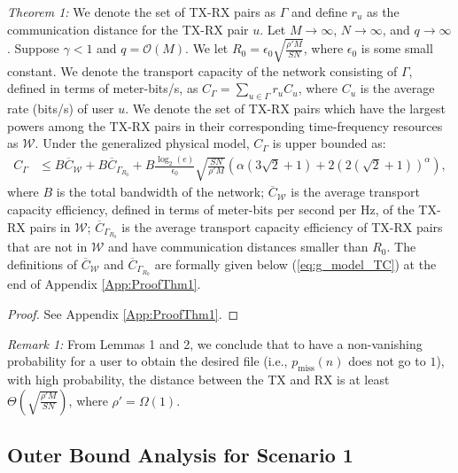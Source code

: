 \documentclass[journal,draftclsnofoot,onecolumn,12pt,twoside]{IEEEtran}
\begin{document}
{\em Theorem 1:} We denote the set of TX-RX pairs as $\Gamma$ and define $r_u$ as the communication distance for the TX-RX pair $u$. Let $M\to\infty$, $N\to\infty$, and $q\to\infty$. Suppose $\gamma<1$ and $q=\mathcal{O}(M)$. We let $R_0=\epsilon_0\sqrt{\frac{\rho'M}{SN}}$, where $\epsilon_0$ is some small constant. We denote the transport capacity of the network consisting of $\Gamma$, defined in terms of meter-bits/s, as $C_{\Gamma}=\sum_{u\in\Gamma}r_uC_u$, where $C_u$ is the average rate (bits/s) of user $u$. We denote the set of TX-RX pairs which have the largest powers among the TX-RX pairs in their corresponding time-frequency resources as $\mathcal{W}$. %
Under the generalized physical model, %
$C_{\Gamma}$ is upper bounded as:
\begin{equation}
\begin{aligned}\label{eq:g_model_TC_Thm}
C_{\Gamma}&\leq B\overline{C}_{\mathcal{W}}+B\overline{C}_{\Gamma_{R_0}}+B\frac{\log_2(e)}{\epsilon_0}\sqrt{\frac{SN}{\rho'M}}\left(\alpha\left(3\sqrt{2}+1\right)+2(2(\sqrt{2}+1))^{\alpha}\right),
\end{aligned}
\end{equation}
where $B$ is the total bandwidth of the network; $\overline{C}_{\mathcal{W}}$ is the average transport capacity efficiency, defined in terms of meter-bits per second per Hz, of the TX-RX pairs in $\mathcal{W}$; $\overline{C}_{\Gamma_{R_0}}$ is the average transport capacity efficiency of TX-RX pairs that are not in $\mathcal{W}$ and have communication distances smaller than $R_0$. The definitions of $\overline{C}_{\mathcal{W}}$ and $\overline{C}_{\Gamma_{R_0}}$ are formally given below (\ref{eq:g_model_TC}) at the end of Appendix \ref{App:ProofThm1}.

\begin{proof}
See Appendix \ref{App:ProofThm1}.
\end{proof}

{\em Remark 1:} From Lemmas 1 and 2, we conclude that to have a non-vanishing probability for a user to obtain the desired file (i.e., $p_{\text{miss}}(n)$ does not go to $1$), with high probability, the distance between the TX and RX is at least $\Theta\left(\sqrt{\frac{\rho'M}{SN}}\right)$, where $\rho'=\Omega(1)$.

\subsection{Outer Bound Analysis for Scenario 1} 
\end{document}
